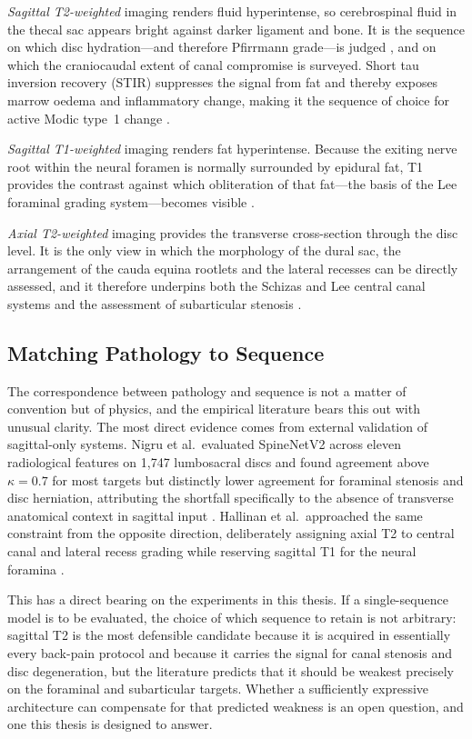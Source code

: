 \emph{Sagittal T2-weighted} imaging renders fluid hyperintense, so cerebrospinal
fluid in the thecal sac appears bright against darker ligament and bone. It is
the sequence on which disc hydration---and therefore Pfirrmann
grade---is judged \cite{pfirrmann2001magnetic}, and on which the
craniocaudal extent of canal compromise is surveyed. Short tau inversion
recovery (STIR) suppresses the signal from fat and thereby exposes marrow
oedema and inflammatory change, making it the sequence of choice for active
Modic type~1 change \cite{gao2022automatic}.

\emph{Sagittal T1-weighted} imaging renders fat hyperintense. Because the exiting
nerve root within the neural foramen is normally surrounded by epidural fat, T1
provides the contrast against which obliteration of that fat---the basis of the
Lee foraminal grading system---becomes visible \cite{lee2010a}.

\emph{Axial T2-weighted} imaging provides the transverse cross-section through
the disc level. It is the only view in which the morphology of the dural sac,
the arrangement of the cauda equina rootlets and the lateral recesses can be
directly assessed, and it therefore underpins both the Schizas and Lee central
canal systems \cite{schizas2010qualitative,lee2011a} and the assessment of
subarticular stenosis \cite{andreisek2014consensus}.

\subsection{Matching Pathology to Sequence}
\label{sec:lr-sequence-matching}

The correspondence between pathology and sequence is not a matter of
convention but of physics, and the empirical literature bears this out with
unusual clarity. The most direct evidence comes from external validation of
sagittal-only systems. Nigru et al.\ evaluated SpineNetV2 across eleven
radiological features on 1{,}747 lumbosacral discs and found agreement above
$\kappa = 0.7$ for most targets but distinctly lower agreement for foraminal
stenosis and disc herniation, attributing the shortfall specifically to the
absence of transverse anatomical context in sagittal input
\cite{nigru2024external}. Hallinan et al.\ approached the same constraint from
the opposite direction, deliberately assigning axial T2 to central canal and
lateral recess grading while reserving sagittal T1 for the neural foramina
\cite{hallinan2021deep}.

This has a direct bearing on the experiments in this thesis. If a
single-sequence model is to be evaluated, the choice of which sequence to
retain is not arbitrary: sagittal T2 is the most defensible candidate because it
is acquired in essentially every back-pain protocol and because it carries the
signal for canal stenosis and disc degeneration, but the literature predicts
that it should be weakest precisely on the foraminal and subarticular targets.
Whether a sufficiently expressive architecture can compensate for that
predicted weakness is an open question, and one this thesis is designed to
answer.

